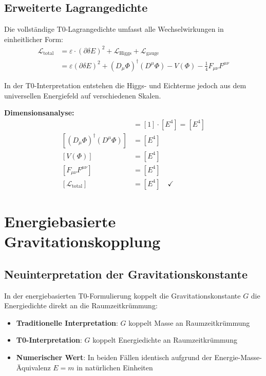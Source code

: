 \documentclass[12pt,a4paper]{report}
\begin{document}
\subsection{Erweiterte Lagrangedichte}
\label{subsec:extended_lagrangian}

Die vollständige T0-Lagrangedichte umfasst alle Wechselwirkungen in einheitlicher Form:
\begin{align}
	\mathcal{L}_{\text{total}} &= \varepsilon \cdot (\partial \delta E)^2 + \mathcal{L}_{\text{Higgs}} + \mathcal{L}_{\text{gauge}} \\
	&= \varepsilon (\partial \delta E)^2 + (D_\mu \Phi)^\dagger (D^\mu \Phi) - V(\Phi) - \frac{1}{4} F_{\mu\nu} F^{\mu\nu}
\end{align}

In der T0-Interpretation entstehen die Higgs- und Eichterme jedoch aus dem universellen Energiefeld auf verschiedenen Skalen.

\textbf{Dimensionsanalyse:}
\begin{align}
	[\varepsilon (\partial \delta E)^2] &= [1] \cdot [E^4] = [E^4] \\
	[(D_\mu \Phi)^\dagger (D^\mu \Phi)] &= [E^4] \\
	[V(\Phi)] &= [E^4] \\
	[F_{\mu\nu} F^{\mu\nu}] &= [E^4] \\
	[\mathcal{L}_{\text{total}}] &= [E^4] \quad \checkmark
\end{align}
	\section{Energiebasierte Gravitationskopplung}
	\label{sec:energy_gravitational_coupling}
	
	\subsection{Neuinterpretation der Gravitationskonstante}
	\label{subsec:gravitational_reinterpretation}
	
	In der energiebasierten T0-Formulierung koppelt die Gravitationskonstante $G$ die Energiedichte direkt an die Raumzeitkrümmung:
	
	\begin{itemize}
		\item \textbf{Traditionelle Interpretation}: $G$ koppelt Masse an Raumzeitkrümmung
		\item \textbf{T0-Interpretation}: $G$ koppelt Energiedichte an Raumzeitkrümmung
		\item \textbf{Numerischer Wert}: In beiden Fällen identisch aufgrund der Energie-Masse-Äquivalenz $E = m$ in natürlichen Einheiten
	\end{itemize}
	
\end{document}
